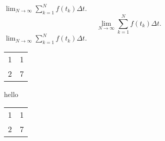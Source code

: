 \documentclass{article}
\begin{document}
$\lim_{N \to \infty} \sum_{k=1}^N f(t_k) \Delta t$.
$$\lim_{N \to \infty} \sum_{k=1}^N f(t_k) \Delta t.$$
$\displaystyle \lim_{N \to \infty} \sum_{k=1}^N f(t_k) \Delta t.$ 

\begin{center}
\begin{tabular}{ c c } 
1 & 1 \\ 2 & 7 \\    
\end{tabular}
\end{center}
hello


\begin{center}
\begin{tabular}{ c c } 
1 & 1  \\ 2 & 7 \\    
\end{tabular}
\end{center}
\end{document}
